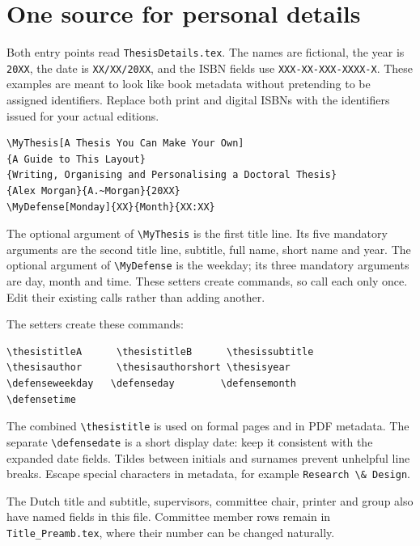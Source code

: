 
\section{One source for personal details}
Both entry points read \texttt{ThesisDetails.tex}. The names are fictional, the
year is \texttt{20XX}, the date is \texttt{XX/XX/20XX}, and the ISBN fields use
\texttt{XXX-XX-XXX-XXXX-X}. These examples are meant to look like book metadata
without pretending to be assigned identifiers. Replace both print and digital
ISBNs with the identifiers issued for your actual editions.

\begin{lstlisting}
\MyThesis[A Thesis You Can Make Your Own]
{A Guide to This Layout}
{Writing, Organising and Personalising a Doctoral Thesis}
{Alex Morgan}{A.~Morgan}{20XX}
\MyDefense[Monday]{XX}{Month}{XX:XX}
\end{lstlisting}
The optional argument of \verb|\MyThesis| is the first title line. Its five
mandatory arguments are the second title line, subtitle, full name, short name
and year. The optional argument of \verb|\MyDefense| is the weekday; its three
mandatory arguments are day, month and time. These setters create commands,
so call each only once. Edit their existing calls rather than adding another.

The setters create these commands:
\begin{lstlisting}
\thesistitleA      \thesistitleB      \thesissubtitle
\thesisauthor      \thesisauthorshort \thesisyear
\defenseweekday   \defenseday        \defensemonth
\defensetime
\end{lstlisting}
The combined
\verb|\thesistitle| is used on formal pages and in PDF metadata.
The separate \verb|\defensedate| is a short display date: keep it consistent
with the expanded date fields. Tildes between initials and surnames prevent
unhelpful line breaks. Escape special characters in metadata, for example
\verb|Research \& Design|.

The Dutch title and subtitle, supervisors, committee chair, printer and group
also have named fields in this file. Committee member rows remain in
\texttt{Title\_Preamb.tex}, where their number can be changed naturally.
